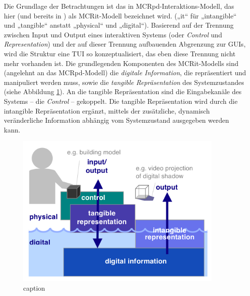 Die Grundlage der Betrachtungen ist das in \citep{Ullmer00} MCRpd-Interaktions-Modell, das hier (und bereits in \citep{Ullmer05}) als \gls{MCRit}-Modell bezeichnet wird. („it“ für „intangible“ und „tangible“ anstatt „physical“ und „digital“). Basierend auf der Trennung zwischen Input und Output eines interaktiven Systems (oder \emph{Control} und \emph{Representation}) und der auf dieser Trennung aufbauenden Abgrenzung zur \glspl{GUI}, wird die Struktur eine \gls{TUI} so konzeptualisiert, das eben diese Trennung nicht mehr vorhanden ist. Die grundlegenden Komponenten des \gls{MCRit}-Modells sind (angelehnt an das \gls{MCRpd}-Modell) die \emph{digitale Information}, die repräsentiert und manipuliert werden muss, sowie die \emph{tangible Repräsentation} des Systemzustandes (siehe Abbildung \ref{fig:img_ImplementierungUeberblick_MCRit}). An die tangible Repräsentation sind die Eingabekanäle des Systems -- die \emph{Control} -- gekoppelt. Die tangible Repräsentation wird durch die intangible Repräsentation ergänzt, mittels der zusätzliche, dynamisch veränderliche Information abhängig vom Systemzustand ausgegeben werden kann.

\begin{figure}[htbp]
	\centering
		\includegraphics[height=3in]{img/ImplementierungUeberblick/MCRit.png}
	\caption{caption}
	\label{fig:img_ImplementierungUeberblick_MCRit}
\end{figure}

